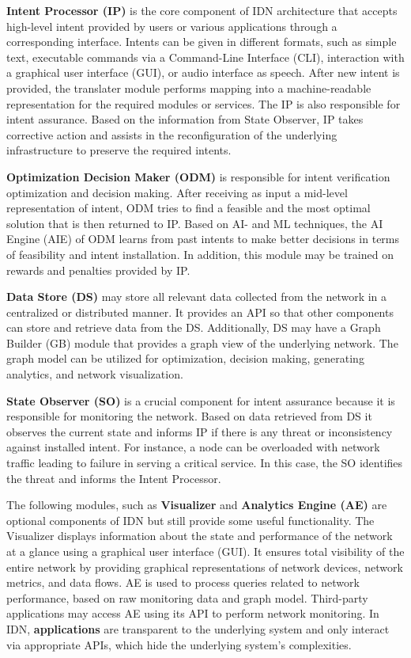 \textbf{Intent Processor (IP)} is the core component of IDN architecture that accepts high-level intent provided by users or various applications through a corresponding interface. Intents can be given in different formats, such as simple text, executable commands via a Command-Line Interface (CLI), interaction with a graphical user interface (GUI), or audio interface as speech. After new intent is provided, the translater module performs mapping into a machine-readable representation for the required modules or services. The IP is also responsible for intent assurance. Based on the information from State Observer, IP takes corrective action and assists in the reconfiguration of the underlying infrastructure to preserve the required intents.

\textbf{Optimization Decision Maker (ODM)} is responsible for intent verification optimization and decision making. After receiving as input a mid-level representation of intent, ODM tries to find a feasible and the most optimal solution that is then returned to IP. Based on AI- and ML techniques, the AI Engine (AIE) of ODM learns from past intents to make better decisions in terms of feasibility and intent installation. In addition, this module may be trained on rewards and penalties provided by IP.

\textbf{Data Store (DS)} may store all relevant data collected from the network in a centralized or distributed manner. It provides an API so that other components can store and retrieve data from the DS. Additionally, DS may have a Graph Builder (GB) module that provides a graph view of the underlying network. The graph model can be utilized for optimization, decision making, generating analytics, and network visualization.

\textbf{State Observer (SO)} is a crucial component for intent assurance because it is responsible for monitoring the network. Based on data retrieved from DS it observes the current state and informs IP if there is any threat or inconsistency against installed intent. For instance, a node can be overloaded with network traffic leading to failure in serving a critical service. In this case, the SO identifies the threat and informs the Intent Processor.

The following modules, such as \textbf{Visualizer} and \textbf{Analytics Engine (AE)} are optional components of IDN but still provide some useful functionality. The Visualizer displays information about the state and performance of the network at a glance using a graphical user interface (GUI). It ensures total visibility of the entire network by providing graphical representations of network devices, network metrics, and data flows. AE is used to process queries related to network performance, based on raw monitoring data and graph model. Third-party applications may access AE using its API to perform network monitoring. In IDN, \textbf{applications} are transparent to the underlying system and only interact via appropriate APIs, which hide the underlying system's complexities.

